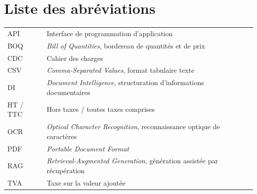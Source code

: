 \chapter*{Liste des abréviations}
\begin{tabularx}{\textwidth}{@{}p{27mm}Y@{}}\toprule
API & Interface de programmation d'application\\
BOQ & \textit{Bill of Quantities}, bordereau de quantités et de prix\\
CDC & Cahier des charges\\
CSV & \textit{Comma-Separated Values}, format tabulaire texte\\
DI & \textit{Document Intelligence}, structuration d'informations documentaires\\
HT / TTC & Hors taxes / toutes taxes comprises\\
OCR & \textit{Optical Character Recognition}, reconnaissance optique de caractères\\
PDF & \textit{Portable Document Format}\\
RAG & \textit{Retrieval-Augmented Generation}, génération assistée par récupération\\
TVA & Taxe sur la valeur ajoutée\\\bottomrule
\end{tabularx}
